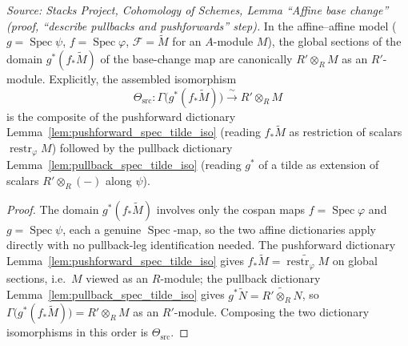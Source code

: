 \begin{lemma}




  \label{lem:base_change_mate_domain_read}
  \textit{Source: Stacks Project, Cohomology of Schemes, Lemma ``Affine base
  change'' (proof, ``describe pullbacks and pushforwards'' step).}
  In the affine--affine model (\(g = \operatorname{Spec}\psi\),
  \(f = \operatorname{Spec}\varphi\), \(\mathcal{F} = \widetilde M\) for an
  \(A\)-module \(M\)), the global sections of the domain \(g^*(f_*\widetilde M)\) of the
  base-change map are canonically \(R' \otimes_R M\) as an \(R'\)-module. Explicitly,
  the assembled isomorphism
  \[
    \Theta_{\mathrm{src}} :
    \Gamma\bigl(g^*(f_*\widetilde M)\bigr) \xrightarrow{\ \sim\ } R' \otimes_R M
  \]
  is the composite of the pushforward dictionary
  Lemma~\ref{lem:pushforward_spec_tilde_iso} (reading \(f_*\widetilde M\) as
  restriction of scalars \(\operatorname{restr}_\varphi M\)) followed by the pullback
  dictionary Lemma~\ref{lem:pullback_spec_tilde_iso} (reading \(g^*\) of a tilde as
  extension of scalars \(R' \otimes_R (-)\) along \(\psi\)).
\end{lemma}

\begin{proof}
  The domain \(g^*(f_*\widetilde M)\) involves only the cospan maps
  \(f = \operatorname{Spec}\varphi\) and \(g = \operatorname{Spec}\psi\), each a genuine
  \(\operatorname{Spec}\)-map, so the two affine dictionaries apply directly with no
  pullback-leg identification needed. The pushforward dictionary
  Lemma~\ref{lem:pushforward_spec_tilde_iso} gives
  \(f_*\widetilde M = \widetilde{\operatorname{restr}_\varphi M}\) on global sections,
  i.e.\ \(M\) viewed as an \(R\)-module; the pullback dictionary
  Lemma~\ref{lem:pullback_spec_tilde_iso} gives
  \(g^*\widetilde N = \widetilde{R' \otimes_R N}\), so
  \(\Gamma\bigl(g^*(f_*\widetilde M)\bigr) = R' \otimes_R M\) as an \(R'\)-module.
  Composing the two dictionary isomorphisms in this order is \(\Theta_{\mathrm{src}}\).
\end{proof}

